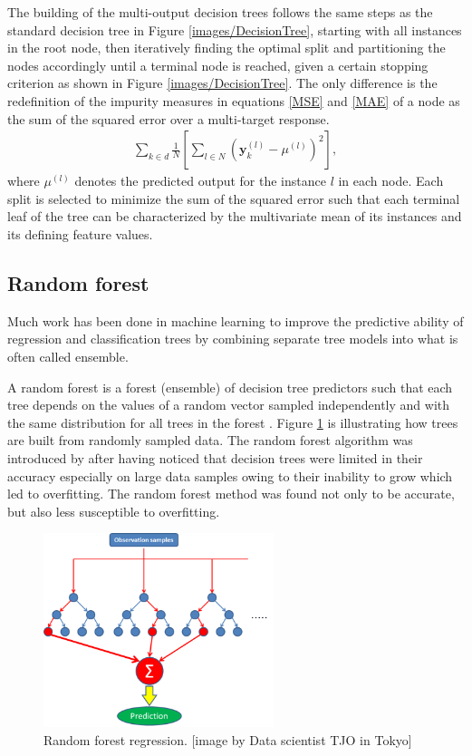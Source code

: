 The building of the multi-output decision trees follows  the same steps as the standard decision tree in Figure \ref{images/DecisionTree}, starting with all instances in the root node, then iteratively finding the optimal split and partitioning the nodes accordingly until a terminal node is reached, given a certain stopping criterion as shown in Figure \ref{images/DecisionTree}. The only difference  is the redefinition of the impurity measures in equations \ref{MSE} and \ref{MAE} of a node as the sum of the squared error  over a multi-target response. 
\begin{align}
\sum_{k\in d}\frac{1}{N}\left[\sum_{l \in N }\left(\textbf{y}_{k}^{(l)}-\mu^{(l)} \right)^2\right],
\end{align}
where $\mu^{(l)}$ denotes the predicted output for the instance $l$ in each node. Each split is selected to minimize the sum of the squared error such that each terminal leaf of the tree can be characterized by the multivariate mean
of its instances and its defining feature values.

\subsection{Random forest}
Much work has been done in machine learning to improve the predictive ability of regression and classification trees by combining separate tree models into what is often called ensemble.

A random forest is a forest (ensemble) of decision tree predictors such that each tree depends on the values of a random vector sampled independently and with the same distribution for all trees in the forest \citep{breiman2001random}. Figure \ref{random tree} is illustrating how trees are built from randomly sampled data. The random forest algorithm  was introduced by \citep{ho1995random} after having noticed that decision trees were limited in their accuracy especially on large data samples owing to their inability to grow which led to overfitting. The random forest method was found not only to be accurate, but also less susceptible to overfitting.

 \begin{figure}[H]
  \centering
    \includegraphics[width=0.6\textwidth]{images/RandomForestTree.png}
    \caption{Random forest regression. [image by Data scientist TJO in Tokyo]}
  \label{random tree}
\end{figure}

